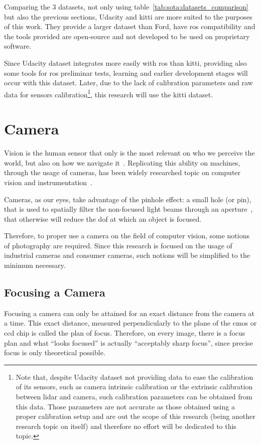 Comparing the 3 datasets, not only using table~\ref{tab:sota:datasets_comparison} but also the previous sections, Udacity and \ac{kitti} are more suited to the purposes of this work. They provide a larger dataset than Ford, have \ac{ros} compatibility and the tools provided are open-source and not developed to be used on proprietary software.

Since Udacity dataset integrates more easily with \ac{ros} than \ac{kitti}, providing also some tools for \ac{ros} preliminar tests, learning and earlier development stages will occur with this dataset. Later, due to the lack of calibration parameters and raw data for sensors calibration\footnote{Note that, despite Udacity dataset not providing data to ease the calibration of its sensors, such as camera intrinsic calibration or the extrinsic calibration between \ac{lidar} and camera, such calibration parameters can be obtained from this data. Those parameters are not accurate as those obtained using a proper calibration setup and are out the scope of this research (being another research topic on itself) and therefore no effort will be dedicated to this topic.}, this research will use the \ac{kitti} dataset.

\section{Camera}
Vision is the human sensor that only is the most relevant on who we perceive the world, but also on how we navigate it~\cite{Ekstrom2015}. Replicating this ability on machines, through the usage of cameras, has been widely researched topic on computer vision and instrumentation~\citeneeded. 

Cameras, as our eyes, take advantage of the pinhole effect: a small hole (or pin), that is used to spatially filter the non-focused light beams through an aperture~\citeneeded, that otherwise will reduce the \ac{dof} at which an object is focused.

Therefore, to proper use a camera on the field of computer vision, some notions of photography are required. Since this research is focused on the usage of industrial cameras and consumer cameras, such notions will be simplified to the minimum necessary. 

\subsection{Focusing a Camera}
Focusing a camera can only be attained for an exact distance from the camera at a time. This exact distance, measured perpendicularly to the plane of the \ac{cmos} or \ac{ccd} chip is called the plan of focus. Therefore, on every image, there is a focus plan and what ``looks focused'' is actually ``acceptably sharp focus'', since precise focus is only theoretical possible.

